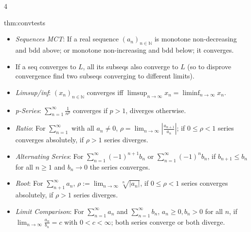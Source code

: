\documentclass[landscape, 8pt]{extarticle}
\begin{document}
\begin{multicols*}{4}
		
		\begin{thm}{thm:convtests}{ }
			\begin{itemize}
				\item \textit{Sequences MCT}: If a real sequence $(a_n)_{n \in \mathbb{N}}$ is monotone non-decreasing and bdd above; or monotone non-increasing and bdd below; it converges.
				\item If a seq converges to $L$, all its subseqs also converge to $L$ (so to disprove convergence find two subseqs converging to different limits).
				\item \textit{Limsup/inf}: $(x_n)_{n\in \mathbb{N}}$ converges iff $\limsup_{n\to \infty}x_n = \liminf_{n \to \infty}x_n$.
				\item \textit{p-Series}: $\sum_{n=1}^{\infty}\frac{1}{n^p}$ converges if $p >1$, diverges otherwise.
				\item \textit{Ratio}: For $\sum_{n=1}^{\infty}$ with all $a_n \ne 0$, $\rho = \lim_{n\to \infty}\left|\frac{a_{n+1}}{a_n}\right|$; if $0 \le \rho < 1$ series converges absolutely, if $\rho > 1$ series diverges.
				\item \textit{Alternating Series}: For $\sum_{n=1}^{\infty} (-1)^{n+1} b_n$ or $\sum_{n=1}^{\infty}(-1)^n b_n$, if $b_{n +1} \le b_n$ for all $n\ge 1$ and $b_n \to 0$ the series converges.
				\item \textit{Root}: For $\sum_{n+1}^{\infty}a_n$, $\rho := \lim_{n\to \infty} \sqrt[n]{\left|a_n\right|}$, if $0 \le \rho < 1$ series converges absolutely, if $\rho > 1$ series diverges.
				\item \textit{Limit Comparison}: For $\sum_{n=1}^{\infty} a_n$ and $\sum_{n=1}^{\infty}b_n$, $a_n \ge 0, b_n > 0$ for all $n$, if $\lim_{n\to \infty} \frac{a_n}{b_n} = c$ with $0 < c < \infty$; both series converge or both diverge.
			\end{itemize}
		
		\end{thm}
		

\end{multicols*}
\end{document}
